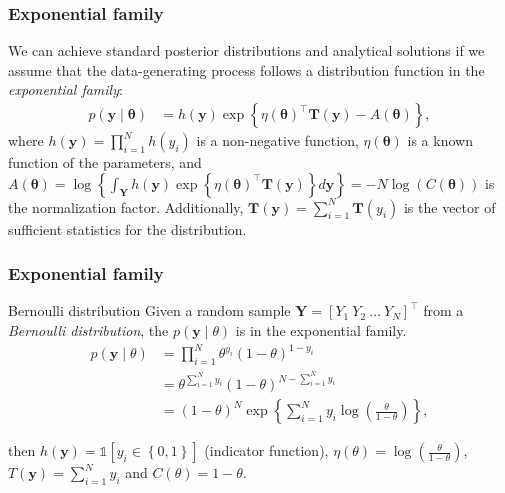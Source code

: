 \documentclass[12pt, compress]{beamer}
\begin{document}
\begin{frame}
	\frametitle{Exponential family}
We can achieve standard posterior distributions and analytical solutions if we assume that the data-generating process follows a distribution function in the \textit{exponential family}:
\begin{align}
	p(\bm{y}\mid \bm{\theta})&=h(\bm{y})\exp\left\{\eta(\bm{\theta})^{\top}\bm{T}(\bm{y})-A(\bm{\theta})\right\}\nonumber,
	\end{align}
where \( h(\bm{y}) = \prod_{i=1}^N h(y_i) \) is a non-negative function, \( \eta(\bm{\theta}) \) is a known function of the parameters, and \( A(\bm{\theta}) = \log\left\{ \int_{\bm{Y}} h(\bm{y}) \exp\left\{ \eta(\bm{\theta})^{\top} \bm{T}(\bm{y}) \right\} d\bm{y} \right\} = -N \log\left(C(\bm{\theta})\right) \) is the normalization factor. Additionally, \( \bm{T}(\bm{y}) = \sum_{i=1}^N \bm{T}(y_i) \) is the vector of sufficient statistics for the distribution.
\end{frame}

\begin{frame}
	\frametitle{Exponential family}
\begin{block}{Bernoulli distribution}
	Given a random sample $\bm{Y}=[Y_1 \ Y_2 \ \dots \ Y_N]^{\top}$ from a \textit{Bernoulli distribution}, the $p(\bm{y}\mid \theta)$ is in the exponential family.
	\begin{align}
		p(\bm{y}\mid \theta)&=\prod_{i=1}^N \theta^{y_i}(1-\theta)^{1-y_i}\nonumber\\
		&=\theta^{\sum_{i=1}^N y_i}(1-\theta)^{N-\sum_{i=1}^N y_i}\nonumber\\
		&=(1-\theta)^N\exp\left\{\sum_{i=1}^N y_i\log\left(\frac{\theta}{1-\theta}\right)\right\}\nonumber,
	\end{align}
	
	then $h(\bm{y})=\mathds{1}[y_i\in\left\{0,1\right\}]$ (indicator function), $\eta(\theta)=\log\left(\frac{\theta}{1-\theta}\right)$, $T(\bm{y})=\sum_{i=1}^N y_i$ and $C(\theta)=1-\theta$.
\end{block}
\end{frame}
\end{document}
